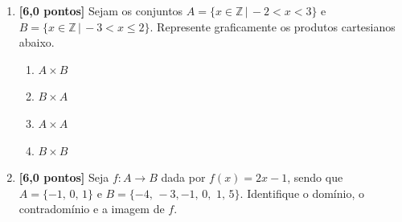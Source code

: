 \documentclass[12pt,a4paper]{article}
\begin{document}
\begin{enumerate}
  \item \textbf{[6,0 pontos]} Sejam os conjuntos $A = \{x\in\mathbb{Z}\,|\, -2 < x < 3\}$ e 
    $B = \{x\in\mathbb{Z}\,|\, -3 < x \leq 2\}$. Represente graficamente os
    produtos cartesianos abaixo.
    \begin{enumerate}
      \item $A\times B$
      \item $B\times A$
      \item $A\times A$
      \item $B\times B$
    \end{enumerate}

  \item \textbf{[6,0 pontos]} Seja $f:A\to B$ dada por $f(x) = 2x - 1$, sendo que
    $A = \{-1,\,0,\,1\}$ e $B = \{-4,\,-3,-1,\,0,\,\,1,\,5\}$.
    Identifique o domínio, o contradomínio e a imagem de $f$.

\end{enumerate}
\end{document}

